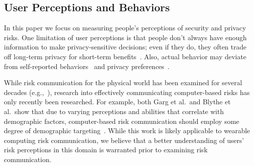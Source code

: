 
\subsection{User Perceptions and Behaviors}
In this paper we focus on measuring people's perceptions of security and privacy risks. One limitation of user perceptions is that people don't always have enough information to make privacy-sensitive decisions; even if they do, they often trade off long-term privacy for short-term benefits~\cite{acquisti2005privacy}. Also, actual behavior may deviate from self-reported behaviors~\cite{jensen2005privacy} and privacy preferences~\cite{spiekermann2001privacy}.

While risk communication for the physical world has been examined for several decades (e.g.,~\cite{Fischhoff,Morgan2001}), research into effectively communicating computer-based risks has only recently been researched. For example, both Garg et al.\ and Blythe et al.\ show that due to varying perceptions and abilities that correlate with demographic factors, computer-based risk communication should employ some degree of demographic targeting~\cite{Garg2012,Blythe2011}. While this work is likely applicable to wearable computing risk communication, we believe that a better understanding of users' risk perceptions in this domain is warranted prior to examining risk communication.